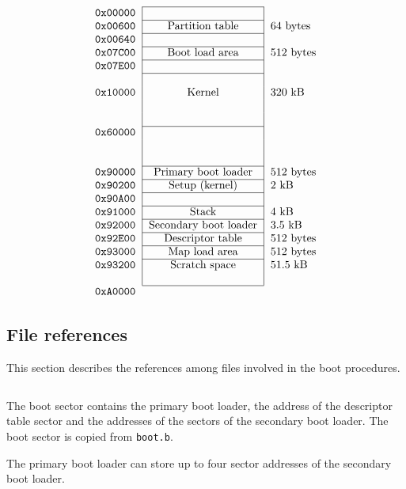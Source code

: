 $$
\begin{tabular}{l|c|l}
  \cline{2-2}
  \tt 0x00000 & & \\
  \cline{2-2}
  \tt 0x00600 & Partition table & 64 bytes \\
  \cline{2-2}
  \tt 0x00640 & & \\
  \cline{2-2}
  \tt 0x07C00 & Boot load area & 512 bytes \\
  \cline{2-2}
  \tt 0x07E00 & & \\
  \cline{2-2}
  & & \\
  \tt 0x10000 & Kernel & 320 kB \\
  & & \\
  & & \\
  \cline{2-2}
  \tt 0x60000 & & \\
  & & \\
  & & \\
  \cline{2-2}
  \tt 0x90000 & Primary boot loader & 512 bytes \\
  \cline{2-2}
  \tt 0x90200 & Setup (kernel) & 2 kB \\
  \cline{2-2}
  \tt 0x90A00 & & \\
  \cline{2-2}
  \tt 0x91000 & Stack & 4 kB \\
  \cline{2-2}
  \tt 0x92000 & Secondary boot loader & 3.5 kB \\
  \cline{2-2}
  \tt 0x92E00 & Descriptor table & 512 bytes \\
  \cline{2-2}
  \tt 0x93000 & Map load area & 512 bytes \\
  \cline{2-2}
  \tt 0x93200 & Scratch space & 51.5 kB \\
  & & \\
  \cline{2-2}
  \multicolumn{3}{l}{\tt 0xA0000} \\
\end{tabular}
$$


\subsection{File references}

This section describes the references among files involved in the boot
procedures.

$$
  
$$

The boot sector contains the primary boot loader, the address of the
descriptor table sector and the addresses of the sectors of the secondary
boot loader. The boot sector is copied from {\tt boot.b}.

The primary boot loader can store up to four sector addresses of the
secondary boot loader.

